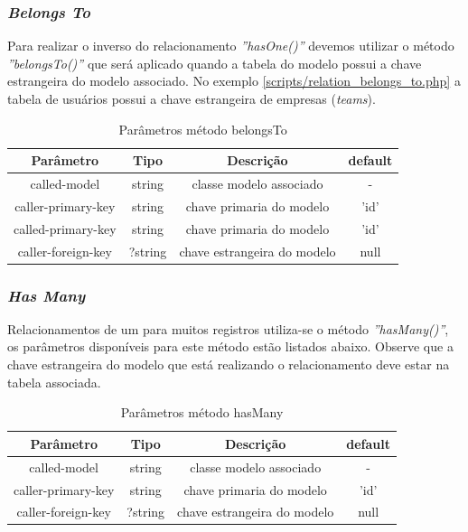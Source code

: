 \spaceH{}

\label{scripts/relation_has_one.php}

\subsubsection{\textit{Belongs To}}
Para realizar o inverso do relacionamento \textit{''hasOne()''} devemos utilizar o método \textit{\textit{''belongsTo()''}} que será aplicado quando a tabela do modelo possui a chave estrangeira do modelo associado. No exemplo \ref{scripts/relation_belongs_to.php} a tabela de usuários possui a chave estrangeira de empresas (\textit{teams}).

\begin{table}[H]
\centering
\vspace{0.5cm}
\begin{tabular}{|c|c|c|c|}
\hline  
Parâmetro & Tipo & Descrição & default\\
\hline 
called-model       & string & classe modelo associado      & -\\
caller-primary-key & string & chave primaria do modelo & 'id'\\
called-primary-key & string & chave primaria do modelo & 'id'\\
caller-foreign-key & ?string & chave estrangeira do modelo & null\\
\hline
\end{tabular}
\caption{Parâmetros método belongsTo}
\end{table}

\spaceH{}

\label{scripts/relation_belongs_to.php}

\subsubsection{\textit{Has Many}}
Relacionamentos de um para muitos registros utiliza-se o método \textit{''hasMany()''}, os parâmetros disponíveis para este método estão listados abaixo. Observe que a chave estrangeira do modelo que está realizando o relacionamento deve estar na tabela associada.

\begin{table}[H]
\centering
\vspace{0.5cm}
\begin{tabular}{|c|c|c|c|}
\hline  
Parâmetro & Tipo & Descrição & default\\
\hline 
called-model       & string & classe modelo associado      & -\\
caller-primary-key & string & chave primaria do modelo & 'id'\\
caller-foreign-key & ?string & chave estrangeira do modelo & null\\
\hline
\end{tabular}
\caption{Parâmetros método hasMany}
\end{table}
\newpage

